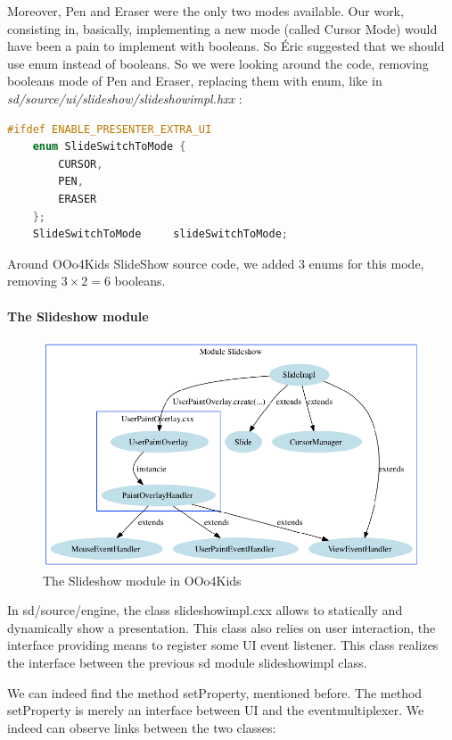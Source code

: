 \documentclass[a4paper,11pt]{article}
\begin{document}
Moreover, Pen and Eraser were the only two modes available. Our work,
consisting in, basically, implementing a new mode (called Cursor Mode) would
have been a pain to implement with booleans. So Éric suggested that we should
use enum instead of booleans. So we were looking around the code, removing
booleans mode of Pen and Eraser, replacing them with enum, like in
\emph{sd/source/ui/slideshow/slideshowimpl.hxx} :

\begin{lstlisting}[language=C++]
#ifdef ENABLE_PRESENTER_EXTRA_UI
    enum SlideSwitchToMode {
        CURSOR,
        PEN,
        ERASER
    };
    SlideSwitchToMode     slideSwitchToMode;
\end{lstlisting}

Around OOo4Kids SlideShow source code, we added 3 enums for this mode, removing $3\times 2 = 6$ booleans.


\paragraph{The Slideshow module}

\begin{figure}[!h]
\centering
\includegraphics[scale=0.5]{images/Slideshow_module.png}
\caption{The Slideshow module in OOo4Kids}
\end{figure}   

In sd/source/engine, the class slideshowimpl.cxx allows to statically and
dynamically show a presentation. This class also relies on user interaction,
the interface providing means to register some UI event listener. This class
realizes the interface between the previous sd module slideshowimpl class.

We can indeed find the method setProperty, mentioned before. The method
setProperty is merely an interface between UI and the eventmultiplexer. We
indeed can observe links between the two classes:
\end{document}
